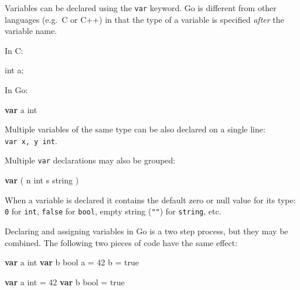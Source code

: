 \documentclass[]{book}
\newenvironment{Shaded}{\begin{snugshade}}{\end{snugshade}}
\newcommand{\DataTypeTok}[1]{\textcolor[rgb]{0.13,0.29,0.53}{#1}}
\newcommand{\DecValTok}[1]{\textcolor[rgb]{0.00,0.00,0.81}{#1}}
\newcommand{\KeywordTok}[1]{\textcolor[rgb]{0.13,0.29,0.53}{\textbf{#1}}}
\newcommand{\NormalTok}[1]{#1}
\newcommand{\OtherTok}[1]{\textcolor[rgb]{0.56,0.35,0.01}{#1}}
\let\BeginKnitrBlock\begin \let\EndKnitrBlock\end
\begin{document}
Variables can be declared using the \texttt{var} keyword. Go is different from other
languages (e.g.~C or C++) in that the type of a variable is specified \emph{after}
the variable name.

In C:

\begin{Shaded}
\begin{Highlighting}[]
\DataTypeTok{int}\NormalTok{ a;}
\end{Highlighting}
\end{Shaded}

In Go:

\begin{Shaded}
\begin{Highlighting}[]
\KeywordTok{var}\NormalTok{ a }\DataTypeTok{int}
\end{Highlighting}
\end{Shaded}

\BeginKnitrBlock{rmdnote}
Multiple variables of the same type can be also declared on a single line:
\texttt{var\ x,\ y\ int}.
\EndKnitrBlock{rmdnote}

Multiple \texttt{var} declarations may also be grouped:

\begin{Shaded}
\begin{Highlighting}[]
\KeywordTok{var}\NormalTok{ (}
\NormalTok{    n }\DataTypeTok{int}
\NormalTok{    s }\DataTypeTok{string}
\NormalTok{)}
\end{Highlighting}
\end{Shaded}

When a variable is declared it contains the default zero or null value for its
type: \texttt{0} for \texttt{int}, \texttt{false} for \texttt{bool}, empty string (\texttt{""}) for \texttt{string}, etc.

Declaring and assigning variables in Go is a two step process, but they may be
combined. The following two pieces of code have the same effect:

\begin{Shaded}
\begin{Highlighting}[]
\KeywordTok{var}\NormalTok{ a }\DataTypeTok{int}
\KeywordTok{var}\NormalTok{ b }\DataTypeTok{bool}
\NormalTok{a = }\DecValTok{42}
\NormalTok{b = }\OtherTok{true}
\end{Highlighting}
\end{Shaded}

\begin{Shaded}
\begin{Highlighting}[]
\KeywordTok{var}\NormalTok{ a }\DataTypeTok{int}\NormalTok{ = }\DecValTok{42}
\KeywordTok{var}\NormalTok{ b }\DataTypeTok{bool}\NormalTok{ = }\OtherTok{true}
\end{Highlighting}
\end{Shaded}
\end{document}

